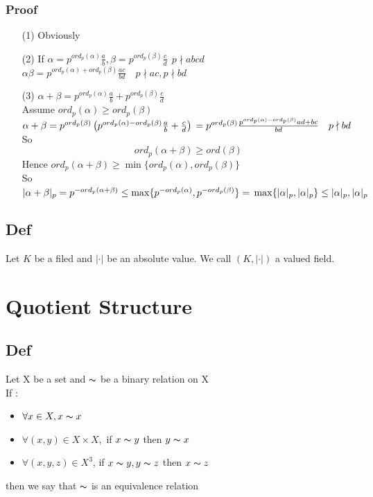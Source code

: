 \documentclass{book}
\begin{document}
\subsection*{Proof}
\begin{itemize}
    \item [(1)] Obviously
    \item [(2)]If $\alpha=p^{ord_p(\alpha)}\frac{a}{b},\beta=p^{ord_p(\beta)}\frac{c}{d}\ \ p\nmid abcd$\\$\alpha\beta=p^{ord_p(\alpha)+ord_p(\beta)}\frac{ac}{bd}\quad p\nmid ac,p\nmid bd$
    \item [(3)]$\alpha+\beta=p^{ord_p(\alpha)}\frac{a}{b}+p^{ord_p(\beta)}\frac{c}{d}$\\Assume $ord_p(\alpha)\geq ord_p(\beta)$\\$\alpha+\beta\\=p^{ord_p(\beta)}\left(p^{ord_p(\alpha)-ord_p(\beta)}\frac{a}{b}+\frac{c}{d}\right)\\=p^{ord_p(\beta)}\frac{p^{ord_p(\alpha)-ord_p(\beta)}ad+bc}{bd}\quad p\nmid bd$\\So $$ord_p(\alpha+\beta)\geq ord(\beta)$$
    Hence $ord_p(\alpha+\beta)\geq \min\{ord_p(\alpha),ord_p(\beta)\}$\\So $\lvert\alpha+\beta\rvert _p=p^{-ord_p(\alpha+\beta)}\leq\max\{p^{-ord_p(\alpha)},p^{-ord_p(\beta)}\}=\\\max\{\lvert \alpha\rvert _p,\lvert \alpha\rvert _p\}\leq\lvert \alpha\rvert _p,\lvert \alpha\rvert _p $
\end{itemize}
\section{Def}
Let $K$ be a filed and $\lvert \cdot\rvert$ be an absolute value. We call $(K,\lvert \cdot\rvert)$ a valued field.
\chapter{Quotient Structure}
\section{Def}

Let X be a set and $\thicksim$  be a binary relation on X\\
If :\begin{itemize}
    \item $\forall x\in X,x\thicksim x$
    \item $\forall (x,y)\in X\times X,$ if $x\thicksim y$ then $y\thicksim x$
    \item $\forall (x,y,z)\in X^3$, if $x\thicksim y,y\thicksim z$ then $x\thicksim z$
\end{itemize}
then we say that $\thicksim$  is an equivalence relation
\end{document}

